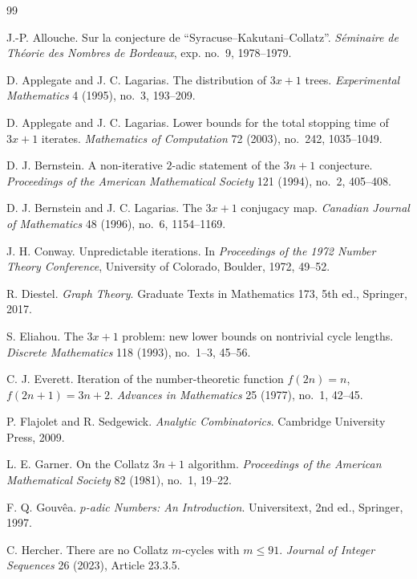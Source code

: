 \documentclass[11pt]{amsart}
\theoremstyle{definition}
\theoremstyle{remark}
\begin{document}
\begin{thebibliography}{99}

J.-P. Allouche.
Sur la conjecture de ``Syracuse--Kakutani--Collatz''.
\emph{S\'eminaire de Th\'eorie des Nombres de Bordeaux}, exp. no.~9, 1978--1979.

D. Applegate and J. C. Lagarias.
The distribution of $3x+1$ trees.
\emph{Experimental Mathematics} 4 (1995), no.~3, 193--209.

D. Applegate and J. C. Lagarias.
Lower bounds for the total stopping time of $3x+1$ iterates.
\emph{Mathematics of Computation} 72 (2003), no.~242, 1035--1049.

D. J. Bernstein.
A non-iterative $2$-adic statement of the $3n+1$ conjecture.
\emph{Proceedings of the American Mathematical Society} 121 (1994), no.~2, 405--408.

D. J. Bernstein and J. C. Lagarias.
The $3x+1$ conjugacy map.
\emph{Canadian Journal of Mathematics} 48 (1996), no.~6, 1154--1169.

J. H. Conway.
Unpredictable iterations.
In \emph{Proceedings of the 1972 Number Theory Conference}, University of Colorado, Boulder, 1972, 49--52.

R. Diestel.
\emph{Graph Theory}.
Graduate Texts in Mathematics 173, 5th ed., Springer, 2017.

S. Eliahou.
The $3x+1$ problem: new lower bounds on nontrivial cycle lengths.
\emph{Discrete Mathematics} 118 (1993), no.~1--3, 45--56.

C. J. Everett.
Iteration of the number-theoretic function $f(2n)=n$, $f(2n+1)=3n+2$.
\emph{Advances in Mathematics} 25 (1977), no.~1, 42--45.

P. Flajolet and R. Sedgewick.
\emph{Analytic Combinatorics}.
Cambridge University Press, 2009.

L. E. Garner.
On the Collatz $3n+1$ algorithm.
\emph{Proceedings of the American Mathematical Society} 82 (1981), no.~1, 19--22.

F. Q. Gouv\^ea.
\emph{$p$-adic Numbers: An Introduction}.
Universitext, 2nd ed., Springer, 1997.

C. Hercher.
There are no Collatz $m$-cycles with $m \leq 91$.
\emph{Journal of Integer Sequences} 26 (2023), Article 23.3.5.


\end{thebibliography}
\end{document}
